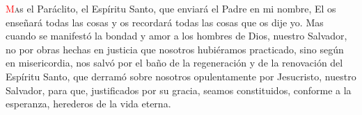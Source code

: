 \lettrine[lines=2]{\textcolor{red}{M}}as el Paráclito, el Espíritu Santo, que enviará el Padre en mi nombre, El os enseñará todas las cosas y os recordará todas las cosas que os dije yo.
Mas cuando se manifestó la bondad y amor a los hombres de Dios, nuestro Salvador, no por obras hechas en justicia que nosotros hubiéramos practicado, sino según en misericordia, nos
salvó por el baño de la regeneración y de la renovación del Espíritu Santo, que derramó sobre nosotros opulentamente por Jesucristo, nuestro Salvador, para que, justificados por su
gracia, seamos constituidos, conforme a la esperanza, herederos de la vida eterna.
